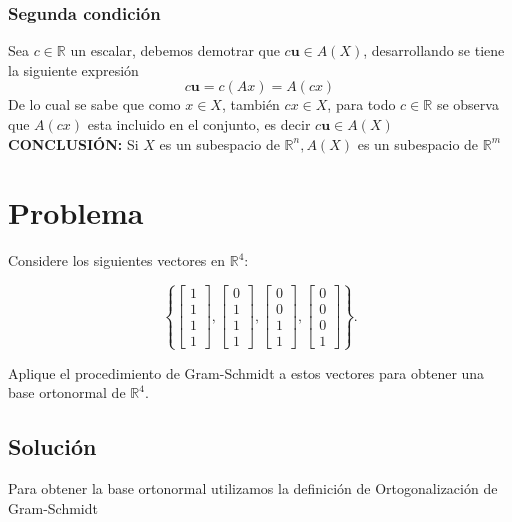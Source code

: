 \subsubsection{Segunda condición}
Sea $c \in \mathbb{R}$ un escalar, debemos demotrar que $c\mathbf{u} \in A(X)$, desarrollando se tiene la siguiente expresión
$$
c \mathbf{u} = c (Ax) = A(cx)
$$
De lo cual se sabe que como $x \in X$, también $cx \in X$, para todo $c \in \mathbb{R}$ se observa que $A(cx)$ esta incluido en el conjunto, es decir $c\mathbf{u} \in A(X)$\\

\textbf{CONCLUSIÓN:} Si $X$ es un subespacio de $\mathbb{R}^n, A(X)$ es un subespacio de $\mathbb{R}^{m}$

\section{Problema}

Considere los siguientes vectores en $\mathbb{R}^4$:

\[
    \left\{ 
    \begin{bmatrix}
    1 \\ 
    1 \\ 
    1 \\
    1
    \end{bmatrix}
    ,
    \begin{bmatrix}
    0 \\ 
    1 \\ 
    1 \\
    1
    \end{bmatrix}
    ,
    \begin{bmatrix}
    0 \\ 
    0 \\ 
    1 \\
    1
    \end{bmatrix}
    ,
    \begin{bmatrix}
    0 \\ 
    0 \\ 
    0 \\
    1
    \end{bmatrix} \right\}.
    \]

Aplique el procedimiento de Gram-Schmidt a estos vectores para obtener una base ortonormal de $\mathbb{R}^4$.

\subsection{Solución}
Para obtener la base ortonormal utilizamos la definición de Ortogonalización de Gram-Schmidt

